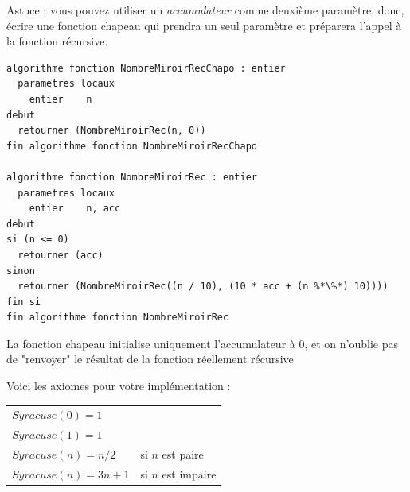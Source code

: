 \documentclass[11pt,a4paper]{article}
\begin{document}
\bigskip



Astuce : vous pouvez utiliser un \textit{accumulateur} comme deuxième paramètre, donc, écrire une fonction chapeau qui prendra un seul paramètre et préparera l'appel à la fonction récursive.


\begin{table}[ht!]
  \centering
\begin{lstlisting}[style=algorithmique]
algorithme fonction NombreMiroirRecChapo : entier
  parametres locaux
    entier    n
debut
  retourner (NombreMiroirRec(n, 0))
fin algorithme fonction NombreMiroirRecChapo

algorithme fonction NombreMiroirRec : entier
  parametres locaux
    entier    n, acc
debut
si (n <= 0)
  retourner (acc)
sinon
  retourner (NombreMiroirRec((n / 10), (10 * acc + (n %*\%*) 10))))
fin si
fin algorithme fonction NombreMiroirRec \end{lstlisting}
  \caption{La fonction chapeau initialise uniquement l'accumulateur à 0, et on n'oublie pas de "renvoyer" le résultat de la fonction réellement récursive}
\end{table}

\bigskip

\newpage


Voici les axiomes pour votre implémentation :

\begin{table}[h!]
  \centering
  \begin{tabular}{l l}
$ Syracuse(0) = 1 $       & \\
$ Syracuse(1) = 1 $       & \\
$ Syracuse(n) = n / 2 $   & si $ n $ est paire \\
$ Syracuse(n) = 3n + 1 $  & si $ n $ est impaire \\
  \end{tabular}
\end{table}
\end{document}
